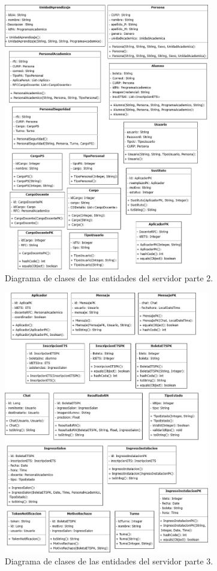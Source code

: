 \begin{figure}[htbp!]
	\begin{center}
		\includegraphics[width=0.8\textwidth]{Clases/EntidadesP2.png}
		\caption{Diagrama de clases de las entidades del servidor parte 2.}
		\label{fig:DE2}
	\end{center}
\end{figure}
\newpage

\begin{figure}[htbp!]
	\begin{center}
		\includegraphics[width=0.8\textwidth]{Clases/EntidadesP3.png}
		\caption{Diagrama de clases de las entidades del servidor parte 3.}
		\label{fig:DE3}
	\end{center}
\end{figure}